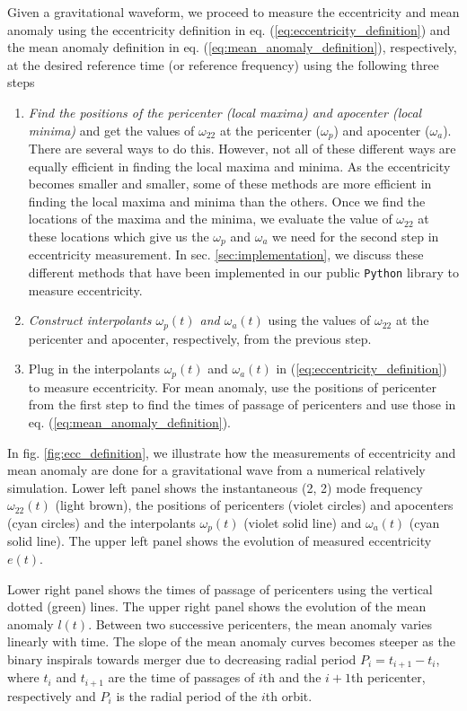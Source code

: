 \documentclass[aps,prd,amsmath,floats,floatfix, twocolumn,
superscriptaddress,nofootinbib,showpacs]{revtex4-1}
\begin{document}
Given a gravitational waveform, we proceed to measure the eccentricity
and mean anomaly using the eccentricity definition in
eq. (\ref{eq:eccentricity_definition}) and the mean anomaly definition
in eq. (\ref{eq:mean_anomaly_definition}), respectively, at the
desired reference time (or reference frequency) using the following
three steps

\begin{enumerate}
\item {\itshape Find the positions of the pericenter (local maxima)
and apocenter (local minima)} and get the values of $\omega_{22}$ at
the pericenter ($\omega_p$) and apocenter ($\omega_a$). There are
several ways to do this. However, not all of these different ways are
equally efficient in finding the local maxima and minima.  As the
eccentricity becomes smaller and smaller, some of these methods are
more efficient in finding the local maxima and minima than the
others. Once we find the locations of the maxima and the minima, we
evaluate the value of $\omega_{22}$ at these locations which give us
the $\omega_p$ and $\omega_a$ we need for the second step in
eccentricity measurement. In sec. \ref{sec:implementation}, we discuss
these different methods that have been implemented in our public
\texttt{Python} library to measure eccentricity.
\item {\itshape Construct interpolants $\omega_p(t)$ and
$\omega_a(t)$} using the values of $\omega_{22}$ at the pericenter and
apocenter, respectively, from the previous step.
\item Plug in the interpolants $\omega_p(t)$ and $\omega_a(t)$ in
(\ref{eq:eccentricity_definition}) to measure eccentricity. For mean
anomaly, use the positions of pericenter from the first step to find
the times of passage of pericenters and use those in
eq. (\ref{eq:mean_anomaly_definition}).
\end{enumerate}

In fig. \ref{fig:ecc_definition}, we illustrate how the measurements
of eccentricity and mean anomaly are done for a gravitational wave
from a numerical relatively simulation. Lower left panel shows the
instantaneous (2, 2) mode frequency $\omega_{22}(t)$ (light brown),
the positions of pericenters (violet circles) and apocenters (cyan
circles) and the interpolants $\omega_p(t)$ (violet solid line) and
$\omega_a(t)$ (cyan solid line). The upper left panel shows the
evolution of measured eccentricity $e(t)$.

Lower right panel shows the times of passage of pericenters using the
vertical dotted (green) lines. The upper right panel shows the
evolution of the mean anomaly $l(t)$. Between two successive
pericenters, the mean anomaly varies linearly with time. The slope of
the mean anomaly curves becomes steeper as the binary inspirals
towards merger due to decreasing radial period $P_{i} = t_{i+1} -
t_i$, where $t_{i}$ and $t_{i+1}$ are the time of passages of $i$th
and the $i+1$th pericenter, respectively and $P_i$ is the radial
period of the $i$th orbit.
\end{document}
